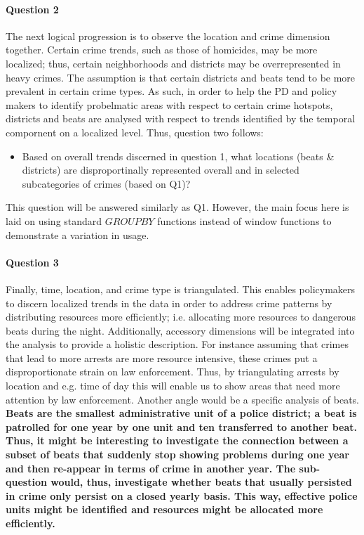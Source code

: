 \documentclass[a4paper]{article}
\begin{document}
\paragraph{Question 2} The next logical progression is to observe the location and crime dimension together. Certain crime trends, such as those of homicides, may be more localized; thus, certain neighborhoods and districts may be overrepresented in heavy crimes. The assumption is that certain districts and beats tend to be more prevalent in certain crime types. As such, in order to help the PD and policy makers to identify probelmatic areas with respect to certain crime hotspots, districts and beats are analysed with respect to trends identified by the temporal compornent on a localized level. Thus, question two follows:

\begin{itemize}
  \item Based on overall trends discerned in question 1, what locations (beats \& districts) are disproportinally represented overall and in selected subcategories of crimes (based on Q1)?
\end{itemize}

This question will be answered similarly as Q1. However, the main focus here is laid on using standard $GROUP BY$ functions instead of window functions to demonstrate a variation in usage. 

\paragraph{Question 3} Finally, time, location, and crime type is triangulated. This enables policymakers to discern localized trends in the data in order to address crime patterns by distributing resources more efficiently; i.e. allocating more resources to dangerous beats during the night. Additionally, accessory dimensions will be integrated into the analysis to provide a holistic description. For instance assuming that crimes that lead to more arrests are more resource intensive, these crimes put a disproportionate strain on law enforcement. Thus, by triangulating arrests by location and e.g. time of day this will enable us to show areas that need more attention by law enforcement. Another angle would be a specific analysis of beats. \textbf{Beats are the smallest administrative unit of a police district; a beat is patrolled for one year by one unit and ten transferred to another beat. Thus, it might be interesting to investigate the connection between a subset of beats that suddenly stop showing problems during one year and then re-appear in terms of crime in another year. The sub-question would, thus, investigate whether beats that usually persisted in crime only persist on a closed yearly basis. This way, effective police units might be identified and resources might be allocated more efficiently.}
 
\end{document}
